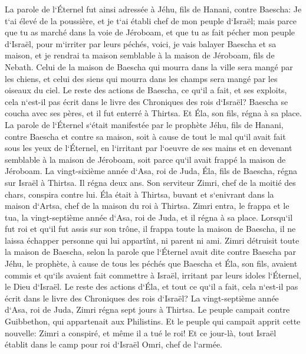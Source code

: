 \verse La parole de l`Éternel fut ainsi adressée à Jéhu, fils de Hanani, contre Baescha: 
\verse Je t`ai élevé de la poussière, et je t`ai établi chef de mon peuple d`Israël; mais parce que tu as marché dans la voie de Jéroboam, et que tu as fait pécher mon peuple d`Israël, pour m`irriter par leurs péchés, 
\verse voici, je vais balayer Baescha et sa maison, et je rendrai ta maison semblable à la maison de Jéroboam, fils de Nebath. 
\verse Celui de la maison de Baescha qui mourra dans la ville sera mangé par les chiens, et celui des siens qui mourra dans les champs sera mangé par les oiseaux du ciel. 
\verse Le reste des actions de Baescha, ce qu`il a fait, et ses exploits, cela n`est-il pas écrit dans le livre des Chroniques des rois d`Israël? 
\verse Baescha se coucha avec ses pères, et il fut enterré à Thirtsa. Et Éla, son fils, régna à sa place. 
\verse La parole de l`Éternel s`était manifestée par le prophète Jéhu, fils de Hanani, contre Baescha et contre sa maison, soit à cause de tout le mal qu`il avait fait sous les yeux de l`Éternel, en l`irritant par l`oeuvre de ses mains et en devenant semblable à la maison de Jéroboam, soit parce qu`il avait frappé la maison de Jéroboam. 
\verse La vingt-sixième année d`Asa, roi de Juda, Éla, fils de Baescha, régna sur Israël à Thirtsa. Il régna deux ans. 
\verse Son serviteur Zimri, chef de la moitié des chars, conspira contre lui. Éla était à Thirtsa, buvant et s`enivrant dans la maison d`Artsa, chef de la maison du roi à Thirtsa. 
\verse Zimri entra, le frappa et le tua, la vingt-septième année d`Asa, roi de Juda, et il régna à sa place. 
\verse Lorsqu`il fut roi et qu`il fut assis sur son trône, il frappa toute la maison de Baescha, il ne laissa échapper personne qui lui appartînt, ni parent ni ami. 
\verse Zimri détruisit toute la maison de Baescha, selon la parole que l`Éternel avait dite contre Baescha par Jéhu, le prophète, 
\verse à cause de tous les péchés que Baescha et Éla, son fils, avaient commis et qu`ils avaient fait commettre à Israël, irritant par leurs idoles l`Éternel, le Dieu d`Israël. 
\verse Le reste des actions d`Éla, et tout ce qu`il a fait, cela n`est-il pas écrit dans le livre des Chroniques des rois d`Israël? 
\verse La vingt-septième année d`Asa, roi de Juda, Zimri régna sept jours à Thirtsa. Le peuple campait contre Guibbethon, qui appartenait aux Philistins. 
\verse Et le peuple qui campait apprit cette nouvelle: Zimri a conspiré, et même il a tué le roi! Et ce jour-là, tout Israël établit dans le camp pour roi d`Israël Omri, chef de l`armée. 

